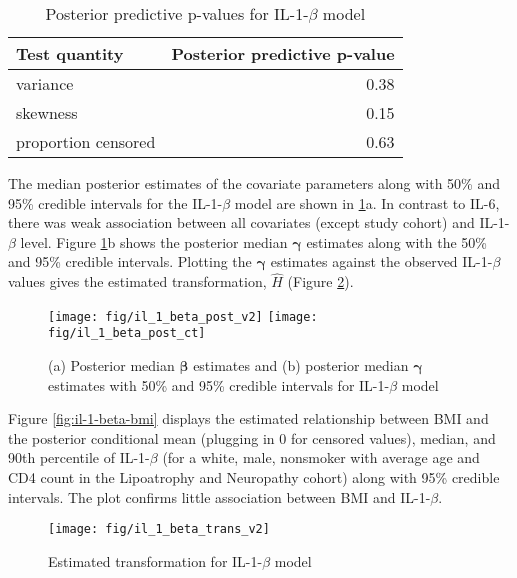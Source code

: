 \documentclass[
]{article}
\begin{document}
\begin{table}[!h]

\caption{\label{tab:ppptab2}Posterior predictive p-values for IL-1-$\beta$ model}
\centering
\begin{tabular}[t]{lr}
\toprule
Test quantity & Posterior predictive p-value\\
\midrule
variance & 0.38\\
skewness & 0.15\\
proportion censored & 0.63\\
\bottomrule
\end{tabular}
\end{table}

The median posterior estimates of the covariate parameters along with 50\% and 95\% credible intervals for the IL-1-\(\beta\) model are shown in \ref{fig:il-1-beta-par00}a. In contrast to IL-6, there was weak association between all covariates (except study cohort) and IL-1-\(\beta\) level. Figure \ref{fig:il-1-beta-par00}b shows the posterior median \(\boldsymbol{\gamma}\) estimates along with the 50\% and 95\% credible intervals. Plotting the \(\boldsymbol{\gamma}\) estimates against the observed IL-1-\(\beta\) values gives the estimated transformation, \(\hat{H}\) (Figure \ref{fig:il-1-beta-trans}).

\begin{figure}

{\centering \texttt{[image: fig/il\_1\_beta\_post\_v2]} \texttt{[image: fig/il\_1\_beta\_post\_ct]} 

}

\caption{(a) Posterior median $\boldsymbol{\beta}$ estimates and (b) posterior median $\boldsymbol{\gamma}$ estimates with 50\% and 95\% credible intervals for IL-1-$\beta$ model}\label{fig:il-1-beta-par00}
\end{figure}

Figure \ref{fig:il-1-beta-bmi} displays the estimated relationship between BMI and the posterior conditional mean (plugging in 0 for censored values), median, and 90th percentile of IL-1-\(\beta\) (for a white, male, nonsmoker with average age and CD4 count in the Lipoatrophy and Neuropathy cohort) along with 95\% credible intervals. The plot confirms little association between BMI and IL-1-\(\beta\).

\begin{figure}

{\centering \texttt{[image: fig/il\_1\_beta\_trans\_v2]} 

}

\caption{Estimated transformation for IL-1-$\beta$ model}\label{fig:il-1-beta-trans}
\end{figure}
\end{document}
